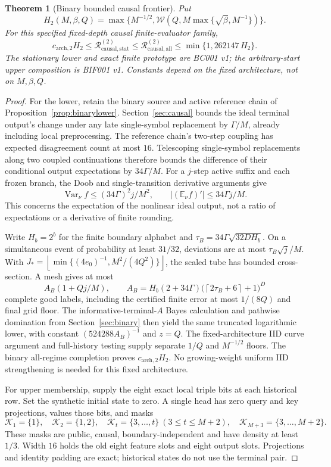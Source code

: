 \documentclass[11pt,letterpaper]{article}
\newtheorem{theorem}{Theorem}[section]
\theoremstyle{definition}\newtheorem{definition}[theorem]{Definition}
\theoremstyle{remark}\newtheorem{remark}[theorem]{Remark}
\newcommand{\E}{\mathbb{E}}
\newcommand{\Var}{\operatorname{Var}}
\newcommand{\floor}[1]{\left\lfloor #1\right\rfloor}
\newcommand{\ceil}[1]{\left\lceil #1\right\rceil}
\newcommand{\Risk}{\mathcal{R}}
\newcommand{\unit}[1]{\textsf{#1}}
\begin{document}
\begin{theorem}[Binary bounded causal frontier]\label{thm:binarycausal}
Put
\[
 H_2(M,\beta,Q)=
 \max\{M^{-1/2},\mathcal W(Q,M\max\{\sqrt\beta,M^{-1}\})\}.
\]
For this specified fixed-depth causal finite-evaluator family,
\[
 c_{\mathrm{arch},2}H_2
 \le\Risk_{\mathrm{causal},\mathrm{stat}}^{(2)}
 \le\Risk_{\mathrm{causal},\mathrm{all}}^{(2)}
 \le\min\{1,262147\,H_2\}.
\]
The stationary lower and exact finite prototype are \unit{BC001 v1}; the arbitrary-start upper composition is \unit{BIF001 v1}. Constants depend on the fixed architecture, not on $M,\beta,Q$.
\end{theorem}
\begin{proof}
For the lower, retain the binary source and active reference chain of Proposition~\ref{prop:binarylower}. Section~\ref{sec:causal} bounds the ideal terminal output's change under any late single-symbol replacement by $\Gamma/M$, already including local preprocessing. The reference chain's two-step coupling has expected disagreement count at most $16$. Telescoping single-symbol replacements along two coupled continuations therefore bounds the difference of their conditional output expectations by $34\Gamma/M$. For a $j$-step active suffix and each frozen branch, the Doob and single-transition derivative arguments give
\[
 \Var_\nu f\le(34\Gamma)^2j/M^2,\qquad
 |(\E_\nu f)'|\le34\Gamma j/M.
\]
This concerns the expectation of the nonlinear ideal output, not a ratio of expectations or a derivative of finite rounding.

Write $H_b=2^b$ for the finite boundary alphabet and
$\tau_B=34\Gamma\sqrt{32DH_b}$. On a simultaneous event of probability at least $31/32$, deviations are at most $\tau_B\sqrt j/M$. With
$J_*=\floor{\min\{(4e_0)^{-1},M^2/(4Q^2)\}}$,
the scaled tube has bounded cross-section. A mesh gives at most
\[
 A_B(1+Qj/M),\qquad
 A_B=H_b(2+34\Gamma)
      \bigl(\ceil{2\tau_B+6}+1\bigr)^D
\]
complete good labels, including the certified finite error at most $1/(8Q)$ and final grid floor. The informative-terminal-$A$ Bayes calculation and pathwise domination from Section~\ref{sec:binary} then yield the same truncated logarithmic lower, with constant $(524288A_B)^{-1}$ and $z=Q$.
The fixed-architecture IID curve argument and full-history testing supply separate $1/Q$ and $M^{-1/2}$ floors. The binary all-regime completion proves $c_{\mathrm{arch},2}H_2$. No growing-weight uniform IID strengthening is needed for this fixed architecture.

For upper membership, supply the eight exact local triple bits at each historical row. Set the synthetic initial state to zero. A single head has zero query and key projections, values those bits, and masks
\[
 \mathcal K_1=\{1\},\quad \mathcal K_2=\{1,2\},\quad
 \mathcal K_t=\{3,\ldots,t\}\ (3\le t\le M+2),\quad
 \mathcal K_{M+3}=\{3,\ldots,M+2\}.
\]
These masks are public, causal, boundary-independent and have density at least $1/3$. Width $16$ holds the old eight feature slots and eight output slots. Projections and identity padding are exact; historical states do not use the terminal pair.


\end{proof}
\end{document}
